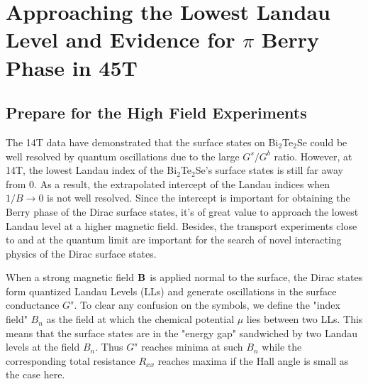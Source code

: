 \section{Approaching the Lowest Landau Level and Evidence for $\pi$ Berry Phase in 45T}
\label{sec:bts:result14T}
\subsection{Prepare for the High Field Experiments}\label{hifield_intro}
%
%
The 14T data have demonstrated that the surface states on Bi$_2$Te$_2$Se could be well resolved by quantum oscillations due to the large $G^s / G^b$ ratio. However, at 14T, the lowest Landau index of the Bi$_2$Te$_2$Se's surface states is still far away from 0. As a result, the extrapolated intercept of the Landau indices when $1/B\to 0$  is not well resolved. Since the intercept is important for obtaining the Berry phase of the Dirac surface states, it's of great value to approach the lowest Landau level at a higher magnetic field. Besides, the transport experiments close to and at the quantum limit are important for the search of novel interacting physics of the Dirac surface states.

When a strong magnetic field $\bf B$ is applied normal to the surface,
the Dirac states form quantized Landau Levels (LLs) and generate oscillations in the surface conductance $G^s$. To clear any confusion on the symbols, we define the "index field" $B_n$ as the field at which the chemical potential $\mu$ lies between two LLs. This means that the surface states are in the "energy gap" sandwiched by two Landau levels at the field $B_n$. Thus $G^s$ reaches minima at such $B_n$ while the corresponding total resistance $R_{xx}$ reaches maxima if the Hall angle is small as the case here. 


